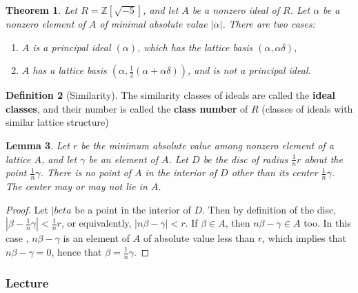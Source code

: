\documentclass[12pt]{article}
\newtheorem{thm}{Theorem}[section]
\newtheorem{lem}[thm]{Lemma}  %
\theoremstyle{definition}
\newtheorem{defn}[thm]{Definition}
\theoremstyle{remark}
\numberwithin{equation}{section}
\newcommand\Z{\mathbb Z}    %
\newcommand\B[1]{\textbf{ #1}}
\begin{document}
\vspace{15pt}


\begin{thm}
        Let $R = \Z[\sqrt{-5}]$, and let $A$ be a nonzero ideal of $R$. Let $\alpha$ be a nonzero element of $A$ of minimal absolute value $|\alpha|$. There are two cases: \begin{enumerate}
                \item $A$ is a principal ideal $(\alpha)$, which has the lattice basis $(\alpha,\alpha\delta)$,
                \item $A$ has a lattice basis $(\alpha,\frac{1}{2}(\alpha+\alpha\delta))$, and is not a principal ideal.
        \end{enumerate}
\end{thm}

\vspace{15pt}

\begin{defn}[Similarity]
        The similarity classes of ideals are called the \B{ideal classes}, and their number is called the \B{class number} of $R$ (classes of ideals with similar lattice structure)
\end{defn}

\vspace{15pt}

\begin{lem}
        Let $r$ be the minimum absolute value among nonzero element of a lattice $A$, and let $\gamma$ be an element of $A$. Let $D$ be the disc of radius $\frac{1}{n}r$ about the point $\frac{1}{n}\gamma$. There is no point of $A$ in the interior of $D$ other than its center $\frac{1}{n}\gamma$. The center may or may not lie in $A$.
\end{lem}
\begin{proof}
        Let $|beta$ be a point in the interior of $D$. Then by definition of the disc, $|\beta - \frac{1}{n}\gamma| < \frac{1}{n}r$, or equivalently, $|n\beta - \gamma| < r$. If $\beta \in A$, then $n\beta - \gamma \in A$ too. In this case , $n\beta - \gamma$ is an element of $A$ of absolute value less than $r$, which implies that $n\beta - \gamma = 0$, hence that $\beta = \frac{1}{n}\gamma$.
\end{proof}

\vspace{15pt}


\subsubsection{Lecture}
\end{document}
